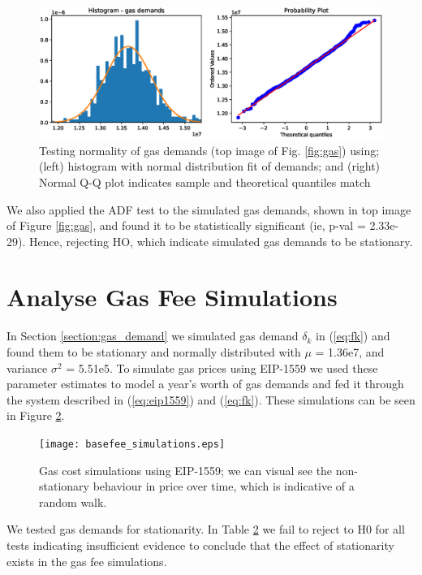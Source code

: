 \documentclass[futureinternet,article,submit,moreauthors,dvi2pdf]{mdpi}
\begin{document}
\begin{figure}
\centering
\includegraphics[width=12 cm]{gaussian_analysis.eps}
\caption{Testing normality of gas demands (top image of Fig. \ref{fig:gas}) using; (left) histogram with normal distribution fit of demands; and (right) Normal Q-Q plot indicates sample and theoretical quantiles match} 
\label{fig:eda}
\end{figure} 

We also applied the ADF test to the simulated gas demands, shown in top image of Figure \ref{fig:gas}, and found it to be statistically significant (ie, p-val = 2.33e-29). Hence, rejecting HO, which indicate simulated gas demands to be stationary. 

\section{Analyse Gas Fee Simulations}
\label{section:gas_fees}

In Section \ref{section:gas_demand} we simulated gas demand  $\delta_{k}$ in (\ref{eq:fk}) and found them to be stationary and normally distributed with $\mu$ = 1.36e7, and variance $\sigma^2$ = 5.51e5. To simulate gas prices using EIP-1559 we used these parameter estimates to model a year's worth of gas demands and fed it through the system described in (\ref{eq:eip1559}) and (\ref{eq:fk}). These simulations can be seen in Figure \ref{fig:basefee_simulations}.

\begin{figure}
\centering
\texttt{[image: basefee\_simulations.eps]}
\caption{Gas cost simulations using EIP-1559; we can visual see the non-stationary behaviour in price over time, which is indicative of a random walk.}  
\label{fig:basefee_simulations}
\end{figure} 

We tested gas demands for stationarity. In Table \ref{fig:basefee_simulations} we fail to reject to H0 for all tests indicating insufficient evidence to conclude that the effect of stationarity exists in the gas fee simulations. 
 
\end{document}
